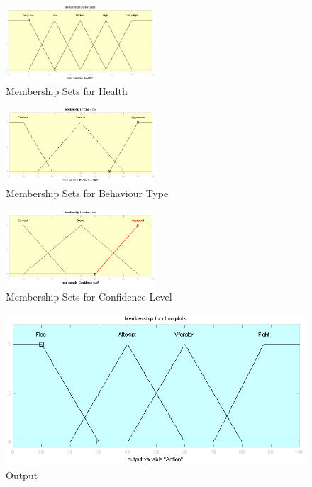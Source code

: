 \begin{figure}[ht]
     \includegraphics[width=0.5\textwidth]{Images/health.png}
    \caption{Membership Sets for Health}
    \label{fig:health}

\end{figure}

\begin{figure}[ht]
    \centering
   \includegraphics[width=0.5\textwidth]{Images/behaviour_type.png}
    \caption{Membership Sets for Behaviour Type}
    \label{fig:behaviour_type}
\end{figure}

\begin{figure}[ht]
    \centering
    \includegraphics[width=0.5\textwidth]{Images/confidence_level.png}
    \caption{Membership Sets for Confidence Level }
    \label{fig:confidence_level}
\end{figure}

\begin{figure}[ht]
    \centering
    \includegraphics[scale=.55]{Images/output.png}
    \caption{Output}
    \label{fig:my_label}
\end{figure}


